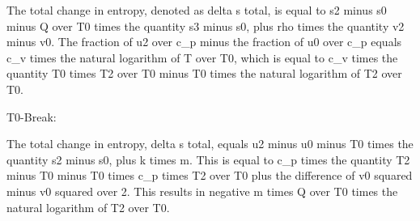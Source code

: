 The total change in entropy, denoted as delta s total, is equal to s2 minus s0 minus Q over T0 times the quantity s3 minus s0, plus rho times the quantity v2 minus v0. The fraction of u2 over c_p minus the fraction of u0 over c_p equals c_v times the natural logarithm of T over T0, which is equal to c_v times the quantity T0 times T2 over T0 minus T0 times the natural logarithm of T2 over T0.

T0-Break:

The total change in entropy, delta s total, equals u2 minus u0 minus T0 times the quantity s2 minus s0, plus k times m. This is equal to c_p times the quantity T2 minus T0 minus T0 times c_p times T2 over T0 plus the difference of v0 squared minus v0 squared over 2. This results in negative m times Q over T0 times the natural logarithm of T2 over T0.